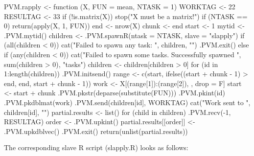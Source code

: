 \begin{Example}
\begin{Scode}
PVM.rapply <- function (X, FUN = mean, NTASK = 1)
{
    WORKTAG <- 22
    RESULTAG <- 33
    if (!is.matrix(X)) {
        stop("X must be a matrix!")
    }
    if (NTASK == 0) {
        return(apply(X, 1, FUN))
    }
    end <- nrow(X)
    chunk <- end%
    start <- 1
    mytid <- .PVM.mytid()
    children <- .PVM.spawnR(ntask = NTASK, slave = "slapply")
    if (all(children < 0)) {
        cat("Failed to spawn any task: ", children, "\n")
        .PVM.exit()
    }
    else if (any(children < 0)) {
        cat("Failed to spawn some tasks.  Successfully spawned ",
            sum(children > 0), "tasks\n")
        children <- children[children > 0]
    }
    for (id in 1:length(children)) {
        .PVM.initsend()
        range <- c(start, ifelse((start + chunk - 1) > end, end,
            start + chunk - 1))
        work <- X[(range[1]):(range[2]), , drop = F]
        start <- start + chunk
        .PVM.pkstr(deparse(substitute(FUN)))
        .PVM.pkint(id)
        .PVM.pkdblmat(work)
        .PVM.send(children[id], WORKTAG)
        cat("Work sent to ", children[id], "\n")
    }
    partial.results <- list()
    for (child in children) {
        .PVM.recv(-1, RESULTAG)
        order <- .PVM.upkint()
        partial.results[[order]] <- .PVM.upkdblvec()
    }
    .PVM.exit()
    return(unlist(partial.results))
}
\end{Scode} 
\label{ex:rpvm-rapplymaster}
\end{Example}

The corresponding slave R script (slapply.R) looks as follows:

